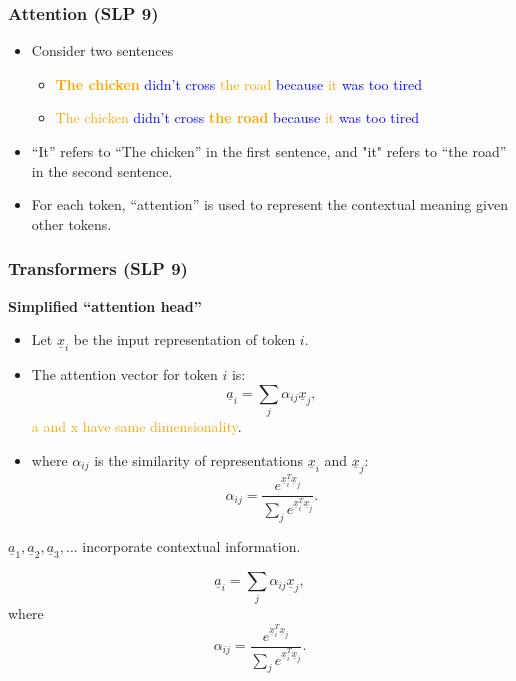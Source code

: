
\subsubsection{Attention (SLP 9)}
\begin{definition}
    \begin{itemize}
        \item Consider two sentences
        \begin{itemize}
            \item \textbf{\textcolor{orange}{The chicken}} \textcolor{blue}{didn’t cross} \textcolor{orange}{the road} \textcolor{blue}{because} \textcolor{orange}{it} \textcolor{blue}{was too tired}
            \item \textcolor{orange}{The chicken} \textcolor{blue}{didn’t cross} \textbf{\textcolor{orange}{the road}} \textcolor{blue}{because} \textcolor{orange}{it} \textcolor{blue}{was too tired}
        \end{itemize}
        \item ``It'' refers to ``The chicken'' in the first sentence, and "it" refers to ``the road'' in the second sentence.
        \item For each token, ``attention'' is used to represent the contextual meaning given other tokens.
    \end{itemize}
\end{definition}


\subsubsection{Transformers (SLP 9)}
\begin{definition}
    \textbf{Simplified ``attention head''}
    \begin{itemize}
        \item Let $\underline{x}_i$ be the input representation of token $i$.
        \item The attention vector for token $i$ is:
        \[
        \underline{a}_i = \sum_j \alpha_{ij} \underline{x}_j,
        \]
        \textcolor{orange}{a and x have same dimensionality}.
        
        \item where $\alpha_{ij}$ is the similarity of representations $\underline{x}_i$ and $\underline{x}_j$:
        \[
        \alpha_{ij} = \frac{e^{\underline{x}_i^T \underline{x}_j}}{\sum_{j} e^{\underline{x}_i^T \underline{x}_j}}.
        \]
    \end{itemize}

    $\underline{a}_1, \underline{a}_2, \underline{a}_3, \dots$ incorporate contextual information.
    \vspace{1em}

    \[
    \underline{a}_i = \sum_j \alpha_{ij} \underline{x}_j,
    \]
    where
    \[
    \alpha_{ij} = \frac{e^{\underline{x}_i^T \underline{x}_j}}{\sum_{j} e^{\underline{x}_i^T \underline{x}_j}}.
    \]
\end{definition}

